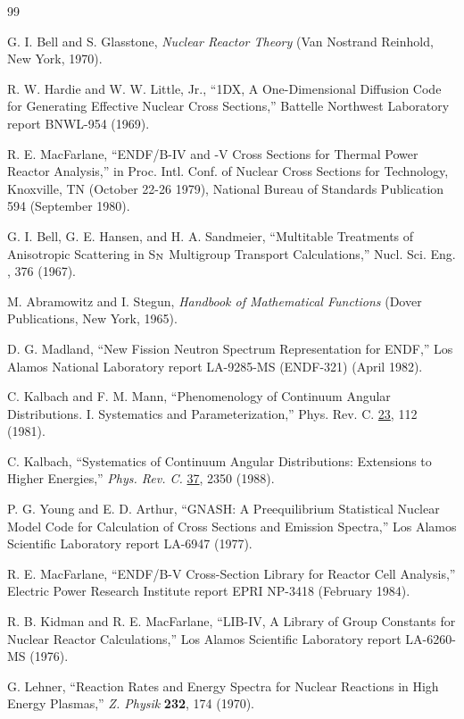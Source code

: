 \documentclass[11pt,twoside]{NJOYMan}
\begin{document}
\begin{thebibliography}{99}
\begin{singlespace}
 G. I. Bell and S. Glasstone, {\it Nuclear Reactor Theory}
  (Van Nostrand Reinhold, New York, 1970).

 R. W. Hardie and W. W. Little, Jr., ``1DX, A One-Dimensional
  Diffusion Code for Generating Effective Nuclear Cross Sections,''
  Battelle Northwest Laboratory report BNWL-954 (1969).

 R. E. MacFarlane, ``ENDF/B-IV and -V Cross Sections for Thermal
  Power Reactor Analysis,'' in Proc. Intl. Conf. of Nuclear Cross Sections
  for Technology, Knoxville, TN (October 22-26 1979), National Bureau of
  Standards Publication 594 (September 1980).

 G. I. Bell, G. E. Hansen, and H. A. Sandmeier, ``Multitable
  Treatments of Anisotropic Scattering in S$_{\rm N}$ Multigroup
  Transport Calculations,'' Nucl. Sci. Eng. , 376 (1967).

  M. Abramowitz and I. Stegun, {\it Handbook of Mathematical
  Functions} (Dover Publications, New York, 1965).

  D. G. Madland, ``New Fission Neutron Spectrum
  Representation for ENDF,'' Los Alamos National Laboratory
  report LA-9285-MS (ENDF-321) (April 1982).

 C. Kalbach and F. M. Mann, ``Phenomenology of Continuum
   Angular Distributions. I. Systematics and Parameterization,''
   Phys. Rev. C. \underline{23}, 112 (1981).

 C. Kalbach, ``Systematics of Continuum Angular Distributions:
  Extensions to Higher Energies,''  {\it Phys. Rev. C.}
  \underline{37}, 2350 (1988).

 P. G. Young and E. D. Arthur, ``GNASH: A Preequilibrium
  Statistical Nuclear Model Code for Calculation of Cross Sections and
  Emission Spectra,''  Los Alamos Scientific Laboratory report LA-6947 (1977).

 R. E. MacFarlane, ``ENDF/B-V Cross-Section
  Library for Reactor Cell Analysis,'' Electric Power Research
  Institute report EPRI NP-3418 (February 1984).

 R. B. Kidman and R. E. MacFarlane, ``LIB-IV, A Library
  of Group Constants for Nuclear Reactor Calculations,'' Los Alamos
  Scientific Laboratory report LA-6260-MS (1976).

 G. Lehner, ``Reaction Rates and Energy Spectra
  for Nuclear Reactions in High Energy Plasmas,'' {\it Z. Physik}
  {\bf 232}, 174 (1970).


\end{singlespace}
\end{thebibliography}
\end{document}
